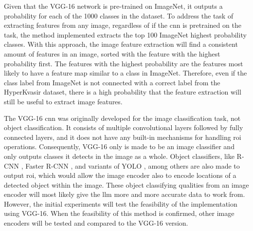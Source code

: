         Given that the VGG-16 network is pre-trained on ImageNet, it outputs a probability for each of the 1000 classes in the dataset. To address the task of extracting features from any image, regardless of if the \gls{cnn} is pretrained on the task, the method implemented extracts the top 100 ImageNet highest probability classes. With this approach, the image feature extraction will find a consistent amount of features in an image, sorted with the feature with the highest probability first. The features with the highest probability are the features most likely to have a feature map similar to a class in ImageNet. Therefore, even if the class label from ImageNet is not connected with a correct label from the HyperKvasir dataset, there is a high probability that the feature extraction will still be useful to extract image features. 

        The VGG-16 \gls{cnn} was originally developed for the image classification task, not object classification. It consists of multiple convolutional layers followed by fully connected layers, and it does not have any built-in mechanisms for handling \gls{roi} operations. Consequently, VGG-16 only is made to be an image classifier and only outputs classes it detects in the image as a whole. Object classifiers, like R-CNN \cite{girshickRichFeatureHierarchies2014}, Faster R-CNN \cite{renFasterRCNNRealTime2015}, and variants of YOLO \cite{redmonYouOnlyLook2016, redmonYOLO9000BetterFaster2016, redmonYOLOv3IncrementalImprovement2018, bochkovskiyYOLOv4OptimalSpeed2020, jocherYolov5, liYOLOv6SingleStageObject2022, wangYOLOv7TrainableBagoffreebies2022, jocherYOLOUltralytics2023}, among others are also made to output \gls{roi}, which would allow the image encoder also to encode locations of a detected object within the image. These object classifying qualities from an image encoder will most likely give the \gls{llm} more and more accurate data to work from. However, the initial experiments will test the feasibility of the implementation using VGG-16. When the feasibility of this method is confirmed, other image encoders will be tested and compared to the VGG-16 version.



